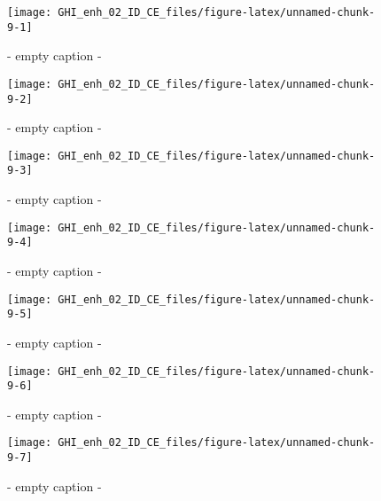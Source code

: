 \documentclass[
  10pt,
  a4paper,oneside]{article}
\begin{document}
\begin{figure}[H]

{\centering \texttt{[image: GHI\_enh\_02\_ID\_CE\_files/figure-latex/unnamed-chunk-9-1]} 

}

\caption{ - empty caption - }\label{fig:unnamed-chunk-9-1}
\end{figure}
\begin{figure}[H]

{\centering \texttt{[image: GHI\_enh\_02\_ID\_CE\_files/figure-latex/unnamed-chunk-9-2]} 

}

\caption{ - empty caption - }\label{fig:unnamed-chunk-9-2}
\end{figure}
\begin{figure}[H]

{\centering \texttt{[image: GHI\_enh\_02\_ID\_CE\_files/figure-latex/unnamed-chunk-9-3]} 

}

\caption{ - empty caption - }\label{fig:unnamed-chunk-9-3}
\end{figure}
\begin{figure}[H]

{\centering \texttt{[image: GHI\_enh\_02\_ID\_CE\_files/figure-latex/unnamed-chunk-9-4]} 

}

\caption{ - empty caption - }\label{fig:unnamed-chunk-9-4}
\end{figure}
\begin{figure}[H]

{\centering \texttt{[image: GHI\_enh\_02\_ID\_CE\_files/figure-latex/unnamed-chunk-9-5]} 

}

\caption{ - empty caption - }\label{fig:unnamed-chunk-9-5}
\end{figure}
\begin{figure}[H]

{\centering \texttt{[image: GHI\_enh\_02\_ID\_CE\_files/figure-latex/unnamed-chunk-9-6]} 

}

\caption{ - empty caption - }\label{fig:unnamed-chunk-9-6}
\end{figure}
\begin{figure}[H]

{\centering \texttt{[image: GHI\_enh\_02\_ID\_CE\_files/figure-latex/unnamed-chunk-9-7]} 

}

\caption{ - empty caption - }\label{fig:unnamed-chunk-9-7}
\end{figure}
\end{document}
